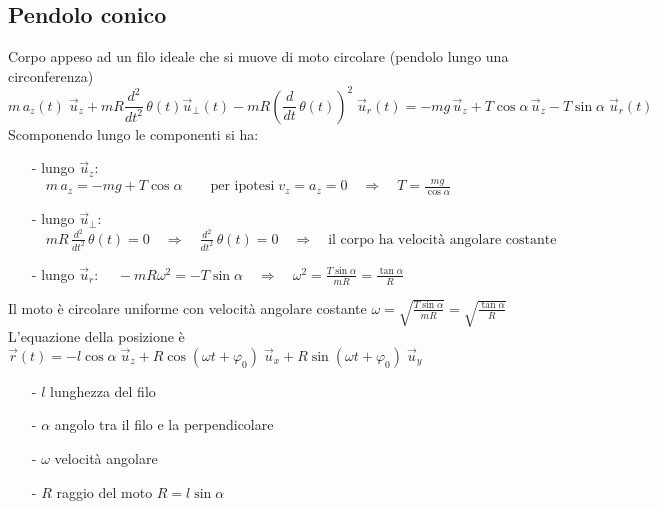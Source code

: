 \documentclass[a4paper]{article}
\newcommand\ux{\vec{u}_x}
\newcommand\uy{\vec{u}_y}
\newcommand\uz{\vec{u}_z}
\newcommand\ur{\vec{u}_r}
\newcommand\uper{\vec{u}_\perp}
\newcommand\dt{\frac{d}{dt}\,}
\newcommand\dts{\frac{d^2}{dt^2}\,}
\begin{document}
\subsection{Pendolo conico}
Corpo appeso ad un filo ideale che si muove di moto circolare (pendolo lungo una circonferenza)
\[m \, a_z(t) \; \uz + mR \dts \theta(t) \uper(t) - mR\left(\dt \theta(t)\right)^2 \; \ur(t) = - mg \, \uz + T \cos \alpha \, \uz - T \sin \alpha \; \ur(t) \]
Scomponendo lungo le componenti si ha:
\begin{itemize}[topsep=3pt, itemsep=0pt]
	\item[-] lungo \(\uz\): \(\displaystyle \quad m \, a_z = -mg + T \cos \alpha \qquad \text{per ipotesi} \; v_z = a_z = 0 \quad \Rightarrow \quad T = \frac{mg}{\cos \alpha}\)
	\item[-] lungo \(\uper\): \(\displaystyle \quad mR \, \dts \theta(t) = 0 \quad \Rightarrow \quad \dts \theta(t) = 0 \quad \Rightarrow \quad \text{il corpo ha velocità angolare costante}\)
	\item[-] lungo \(\ur\): \(\displaystyle \quad -mR \omega^2 = -T \sin \alpha \quad \Rightarrow \quad \omega^2 = \frac{T \sin \alpha}{mR} = \frac{\tan \alpha}{R}\)
\end{itemize}
Il moto è circolare uniforme con velocità angolare costante \(\displaystyle \omega = \sqrt{\frac{T \sin \alpha}{mR}} = \sqrt{\frac{\tan \alpha}{R}}\) \\
L'equazione della posizione è \(\displaystyle \vec{r}(t) = - l \cos \alpha \; \uz + R \cos (\omega t + \varphi_0) \; \ux + R \sin (\omega t + \varphi_0) \; \uy\)
\begin{itemize}[topsep=3pt, itemsep=0pt]
	\item[-] \(l\) lunghezza del filo
	\item[-] \(\alpha\) angolo tra il filo e la perpendicolare
	\item[-] \(\omega\) velocità angolare
	\item[-] \(R\) raggio del moto \(R = l \sin \alpha\)
\end{itemize}

\newpage
\end{document}
